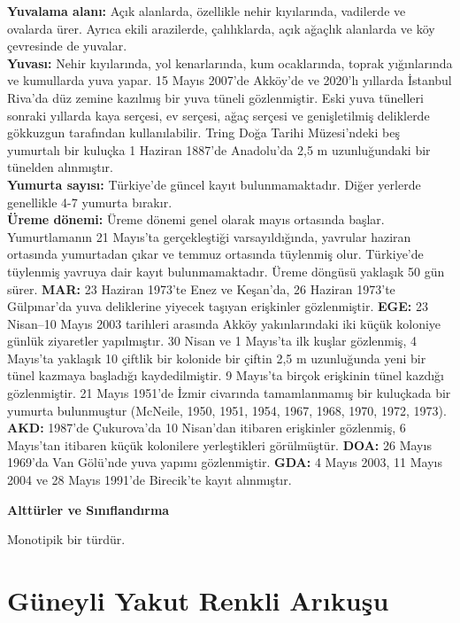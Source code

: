 \documentclass[
  10.5pt,
  a4paper,
  DIV=11,
  numbers=noendperiod,
  twocolumn]{scrreprt}
\begin{document}
\textbf{Yuvalama alanı:} Açık alanlarda, özellikle nehir kıyılarında,
vadilerde ve ovalarda ürer. Ayrıca ekili arazilerde, çalılıklarda, açık
ağaçlık alanlarda ve köy çevresinde de yuvalar.\\
\textbf{Yuvası:} Nehir kıyılarında, yol kenarlarında, kum ocaklarında,
toprak yığınlarında ve kumullarda yuva yapar. 15 Mayıs 2007'de Akköy'de
ve 2020'lı yıllarda İstanbul Riva'da düz zemine kazılmış bir yuva tüneli
gözlenmiştir. Eski yuva tünelleri sonraki yıllarda kaya serçesi, ev
serçesi, ağaç serçesi ve genişletilmiş deliklerde gökkuzgun tarafından
kullanılabilir. Tring Doğa Tarihi Müzesi'ndeki beş yumurtalı bir kuluçka
1 Haziran 1887'de Anadolu'da 2,5 m uzunluğundaki bir tünelden
alınmıştır.\\
\textbf{Yumurta sayısı:} Türkiye'de güncel kayıt bulunmamaktadır. Diğer
yerlerde genellikle 4-7 yumurta bırakır.\\
\textbf{Üreme dönemi:} Üreme dönemi genel olarak mayıs ortasında başlar.
Yumurtlamanın 21 Mayıs'ta gerçekleştiği varsayıldığında, yavrular
haziran ortasında yumurtadan çıkar ve temmuz ortasında tüylenmiş olur.
Türkiye'de tüylenmiş yavruya dair kayıt bulunmamaktadır. Üreme döngüsü
yaklaşık 50 gün sürer. \textbf{MAR:} 23 Haziran 1973'te Enez ve
Keşan'da, 26 Haziran 1973'te Gülpınar'da yuva deliklerine yiyecek
taşıyan erişkinler gözlenmiştir. \textbf{EGE:} 23 Nisan--10 Mayıs 2003
tarihleri arasında Akköy yakınlarındaki iki küçük koloniye günlük
ziyaretler yapılmıştır. 30 Nisan ve 1 Mayıs'ta ilk kuşlar gözlenmiş, 4
Mayıs'ta yaklaşık 10 çiftlik bir kolonide bir çiftin 2,5 m uzunluğunda
yeni bir tünel kazmaya başladığı kaydedilmiştir. 9 Mayıs'ta birçok
erişkinin tünel kazdığı gözlenmiştir. 21 Mayıs 1951'de İzmir civarında
tamamlanmamış bir kuluçkada bir yumurta bulunmuştur (McNeile, 1950,
1951, 1954, 1967, 1968, 1970, 1972, 1973). \textbf{AKD:} 1987'de
Çukurova'da 10 Nisan'dan itibaren erişkinler gözlenmiş, 6 Mayıs'tan
itibaren küçük kolonilere yerleştikleri görülmüştür. \textbf{DOA:} 26
Mayıs 1969'da Van Gölü'nde yuva yapımı gözlenmiştir. \textbf{GDA:} 4
Mayıs 2003, 11 Mayıs 2004 ve 28 Mayıs 1991'de Birecik'te kayıt
alınmıştır.

\textbf{Alttürler ve Sınıflandırma}

Monotipik bir türdür.

\section{Güneyli Yakut Renkli
Arıkuşu}\label{guxfcneyli-yakut-renkli-arux131kuux15fu}
\end{document}
